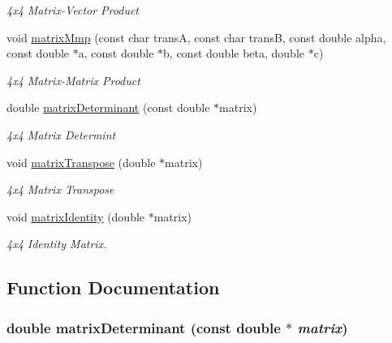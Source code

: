 \begin{CompactItemize}
\begin{CompactList}\small\item\em 4x4 Matrix-Vector Product \item\end{CompactList}\item 
void \hyperlink{group__a_g83ebfef715d1b7634526d23bed49d68c}{matrixMmp} (const char transA, const char transB, const double alpha, const double $\ast$a, const double $\ast$b, const double beta, double $\ast$c)
\begin{CompactList}\small\item\em 4x4 Matrix-Matrix Product \item\end{CompactList}\item 
double \hyperlink{group__a_ga173dc4c93e8bc6f1747c5367f63afd8}{matrixDeterminant} (const double $\ast$matrix)
\begin{CompactList}\small\item\em 4x4 Matrix Determint \item\end{CompactList}\item 
void \hyperlink{group__a_g39674801055355a4eb3338ba6023b83c}{matrixTranspose} (double $\ast$matrix)
\begin{CompactList}\small\item\em 4x4 Matrix Transpose \item\end{CompactList}\item 
void \hyperlink{group__a_g0621678b0351aa86eda18b2e559c7f71}{matrixIdentity} (double $\ast$matrix)
\begin{CompactList}\small\item\em 4x4 Identity Matrix. \item\end{CompactList}\end{CompactItemize}


\subsection{Function Documentation}
\hypertarget{group__a_ga173dc4c93e8bc6f1747c5367f63afd8}{
\subsubsection[matrixDeterminant]{\setlength{\rightskip}{0pt plus 5cm}double matrixDeterminant (const double $\ast$ {\em matrix})}}
\label{group__a_ga173dc4c93e8bc6f1747c5367f63afd8}


